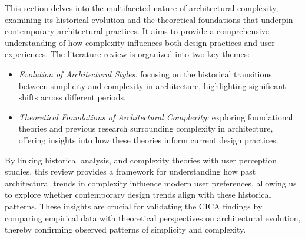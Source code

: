 






This section delves into the multifaceted nature of architectural complexity, examining its historical evolution and the theoretical foundations that underpin contemporary architectural practices.
It aims to provide a comprehensive understanding of how complexity influences both design practices and user experiences.
The literature review is organized into two key themes:

\begin{itemize}
    \item \textit{Evolution of Architectural Styles:} focusing on the historical transitions between simplicity and complexity in architecture, highlighting significant shifts across different periods.
    \item \textit{Theoretical Foundations of Architectural Complexity:} exploring foundational theories and previous research surrounding complexity in architecture, offering insights into how these theories inform current design practices.
\end{itemize}

By linking historical analysis, and complexity theories with user perception studies, this review provides a framework for understanding how past architectural trends in complexity influence modern user preferences, allowing us to explore whether contemporary design trends align with these historical patterns.
These insights are crucial for validating the CICA findings by comparing empirical data with theoretical perspectives on architectural evolution, thereby confirming observed patterns of simplicity and complexity.

